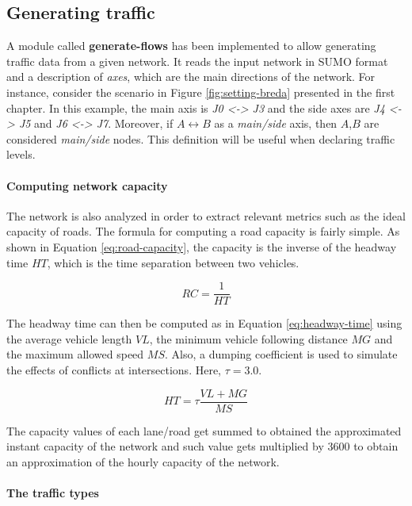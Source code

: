 \subsection{Generating traffic}

A module called \textbf{generate-flows} has been implemented to allow generating traffic data from a given network.
It reads the input network in SUMO format and a description of \textit{axes}, which are the main directions of the network.
For instance, consider the scenario in Figure \ref{fig:setting-breda} presented in the first chapter.
In this example, the main axis is \textit{J0 <-> J3} and the side axes are \textit{J4 <-> J5} and \textit{J6 <-> J7}.
Moreover, if $A \leftrightarrow B$ as a \textit{main/side} axis, then $A$,$B$ are considered \textit{main/side} nodes.
This definition will be useful when declaring traffic levels.

\paragraph{Computing network capacity}

The network is also analyzed in order to extract relevant metrics such as the ideal capacity of roads.
The formula for computing a road capacity is fairly simple. As shown in Equation \ref{eq:road-capacity}, the capacity is the inverse of the headway time $HT$, which is the time separation between two vehicles.

\begin{equation} \label{eq:road-capacity}
  RC = \frac {1} {HT}
\end{equation}

The headway time can then be computed as in Equation \ref{eq:headway-time} using the average vehicle length $VL$, the minimum vehicle following distance $MG$ and the maximum allowed speed $MS$.
Also, a dumping coefficient is used to simulate the effects of conflicts at intersections. Here, $\tau = 3.0$.

\begin{equation} \label{eq:headway-time}
  HT = \tau \frac {VL + MG} {MS}
\end{equation}

The capacity values of each lane/road get summed to obtained the approximated instant capacity of the network and such value gets multiplied by $3600$ to obtain an approximation of the hourly capacity of the network.

\paragraph{The traffic types}


